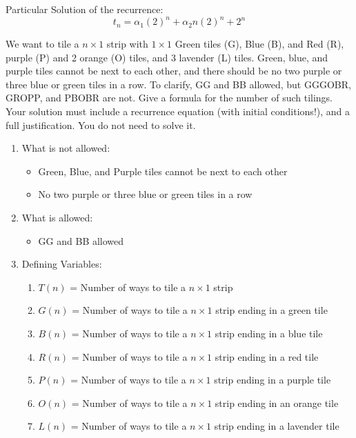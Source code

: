 \documentclass[11pt]{article}
\newcounter{prnum}
\newenvironment{problem}{{\vskip 0.2in\noindent\bf Problem
       \addtocounter{prnum}{1} \arabic{prnum}.}}{\vskip 0.1in}
\begin{document}
\begin{problem}
\begin{enumerate}[label=\alph*)]
\begin{enumerate}
          Particular Solution of the recurrence:
        \begin{equation}
          t_n = \alpha_1(2)^n + \alpha_2n(2)^n + 2^n
        \end{equation}
    \end{enumerate}
\end{enumerate}
  
\end{problem}


\begin{problem}
  We want to tile a $n \times 1$ strip with $1 \times 1$ Green tiles (G), Blue (B), and Red (R),  \times{} purple (P) and 2 \times{} orange (O) tiles, and 3 \times{} lavender (L) tiles. 
  Green, blue, and purple tiles cannot be next to each other, 
  and there should be no two purple or three blue or green tiles in a row. 
  To clarify, GG and BB allowed, but GGGOBR, GROPP, and PBOBR are not.
  Give a formula for the number of such tilings. Your
  solution must include a recurrence equation (with initial conditions!), 
  and a full justification. You do not need to solve it.
\begin{enumerate}
  \item What is not allowed: 
    \begin{itemize}
      \item Green, Blue, and Purple tiles cannot be next to each other
      \item No two purple or three blue or green tiles in a row
    \end{itemize}
  \item What is allowed:
    \begin{itemize}
      \item GG and BB allowed
    \end{itemize}
  \item Defining Variables:
    \begin{enumerate}
      \item $T(n)$ = Number of ways to tile a $n \times 1$ strip
      \item $G(n)$ = Number of ways to tile a $n \times 1$ strip ending in a green tile
      \item $B(n)$ = Number of ways to tile a $n \times 1$ strip ending in a blue tile
      \item $R(n)$ = Number of ways to tile a $n \times 1$ strip ending in a red tile
      \item $P(n)$ = Number of ways to tile a $n \times 1$ strip ending in a purple tile
      \item $O(n)$ = Number of ways to tile a $n \times 1$ strip ending in an orange tile
      \item $L(n)$ = Number of ways to tile a $n \times 1$ strip ending in a lavender tile
    \end{enumerate}
    \pagebreak


\end{enumerate}
\end{problem}
\end{document}
